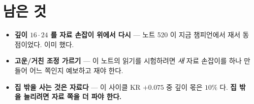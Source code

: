 \documentclass[11pt]{article}
\begin{document}
\section*{남은 것}

\begin{itemize}
\item \textbf{깊이 $16 \cdot 24$ 를 자료 손잡이 위에서 다시} --- 노트 520
이 지금 챔피언에서 재서 동점이었다. 이미 했다.
\item \textbf{고운/거친 조정 가르기} --- 이 노트의 읽기를 시험하려면
\emph{새} 자료 손잡이를 하나 만들어 어느 쪽인지 예보하고 재야 한다.
\item \textbf{집 밖을 사는 것은 자료다} --- 이 사이클 KR $+0.075$ 중 깊이
몫은 $10\%$ 다. \textbf{집 밖을 늘리려면 자료 쪽을 더 파야 한다.}
\end{itemize}
\end{document}

